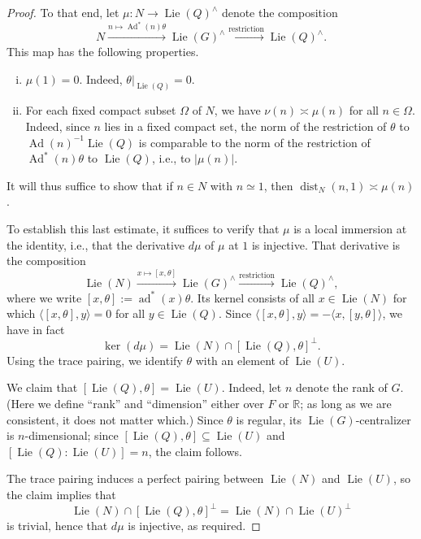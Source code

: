 \documentclass[reqno]{amsart}
\DeclareMathOperator{\ad}{ad}
\DeclareMathOperator{\Ad}{Ad}
\DeclareMathOperator{\dist}{dist}
\DeclareMathOperator{\Lie}{Lie}
\theoremstyle{plain} \newtheorem{theorem} {Theorem}
\theoremstyle{definition} \newtheorem{definition} [theorem] {Definition}
\theoremstyle{itplain} %
\numberwithin{equation}{section}
\numberwithin{theorem}{section}
\begin{document}
\begin{proof}
  To that end, let $\mu : N \rightarrow \Lie(Q)^\wedge$ denote the composition
  \begin{equation*}
    N \xrightarrow{n \mapsto \Ad^*(n) \theta } \Lie(G)^\wedge \xrightarrow{\text{restriction}} \Lie(Q)^\wedge.
  \end{equation*}
  This map has the following properties.
  \begin{enumerate}[(i)]
  \item $\mu(1) = 0$.  Indeed, $\theta|_{\Lie(Q)} = 0$.
  \item For each fixed compact subset $\Omega$ of $N$, we have $\nu(n) \asymp \mu(n)$ for all $n \in \Omega$.  Indeed, since $n$ lies in a fixed compact set, the norm of the restriction of $\theta$ to $\Ad(n)^{-1} \Lie(Q)$ is comparable to the norm of the restriction of $\Ad^*(n) \theta$ to $\Lie(Q)$, i.e., to $|\mu(n)|$.
  \end{enumerate}
  It will thus suffice to show that if $n \in N$ with $n \simeq 1$, then $\dist_N(n,1) \asymp \mu(n)$.

  To establish this last estimate, it suffices to verify that $\mu$ is a local immersion at the identity, i.e., that the derivative $d \mu$ of $\mu$ at $1$ is injective.  That derivative is the composition
  \begin{equation*}
    \Lie(N) \xrightarrow{x \mapsto [x,\theta]} \Lie(G)^\wedge \xrightarrow{\text{restriction}} \Lie(Q)^\wedge,
  \end{equation*}
  where we write $[x,\theta] := \ad^*(x)\theta$.
  Its kernel consists of all $x \in \Lie(N)$ for which $\langle [x,\theta], y \rangle = 0$ for all $y \in \Lie(Q)$.  Since $\langle [x,\theta], y \rangle = -\langle x, [y,\theta] \rangle$, we have in fact
  \begin{equation*}
    \ker(d \mu) = \Lie(N) \cap [\Lie(Q), \theta]^\perp.
  \end{equation*}
  Using the trace pairing, we identify $\theta$ with an element of $\Lie(U)$.

  We claim that $[\Lie(Q), \theta] = \Lie(U)$.  Indeed, let $n$ denote the rank of $G$.  (Here we define ``rank'' and ``dimension'' either over $F$ or $\mathbb{R}$; as long as we are consistent, it does not matter which.)  Since $\theta$ is regular, its $\Lie(G)$-centralizer is $n$-dimensional; since $[\Lie(Q), \theta] \subseteq \Lie(U)$ and $[\Lie(Q):\Lie(U)] = n$, the claim follows.

  The trace pairing induces a perfect pairing between $\Lie(N)$ and $\Lie(U)$, so the claim implies that
  \begin{equation*}
    \Lie(N) \cap [\Lie(Q), \theta]^\perp = \Lie(N) \cap \Lie(U)^\perp
  \end{equation*}
  is trivial, hence that $d \mu$ is injective, as required.
\end{proof}
\end{document}
